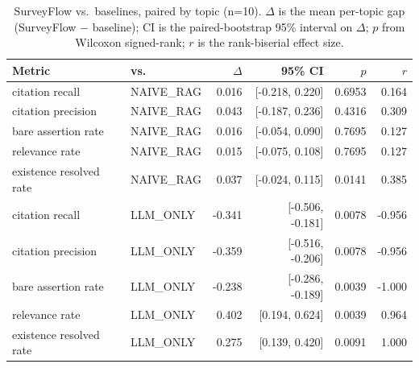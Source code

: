 \begin{table}[t]
\centering
\small
\caption{SurveyFlow vs.\ baselines, paired by topic (n=10). $\Delta$ is the mean per-topic gap (SurveyFlow $-$ baseline); CI is the paired-bootstrap 95\% interval on $\Delta$; $p$ from Wilcoxon signed-rank; $r$ is the rank-biserial effect size.}
\label{tab:significance}
\begin{tabular}{llrrrr}
\toprule
Metric & vs.\ & $\Delta$ & 95\% CI & $p$ & $r$ \\
\midrule
citation recall & NAIVE_RAG & 0.016 & [-0.218, 0.220] & 0.6953 & 0.164 \\
citation precision & NAIVE_RAG & 0.043 & [-0.187, 0.236] & 0.4316 & 0.309 \\
bare assertion rate & NAIVE_RAG & 0.016 & [-0.054, 0.090] & 0.7695 & 0.127 \\
relevance rate & NAIVE_RAG & 0.015 & [-0.075, 0.108] & 0.7695 & 0.127 \\
existence resolved rate & NAIVE_RAG & 0.037 & [-0.024, 0.115] & 0.0141 & 0.385 \\
citation recall & LLM_ONLY & -0.341 & [-0.506, -0.181] & 0.0078 & -0.956 \\
citation precision & LLM_ONLY & -0.359 & [-0.516, -0.206] & 0.0078 & -0.956 \\
bare assertion rate & LLM_ONLY & -0.238 & [-0.286, -0.189] & 0.0039 & -1.000 \\
relevance rate & LLM_ONLY & 0.402 & [0.194, 0.624] & 0.0039 & 0.964 \\
existence resolved rate & LLM_ONLY & 0.275 & [0.139, 0.420] & 0.0091 & 1.000 \\
\bottomrule
\end{tabular}
\end{table}